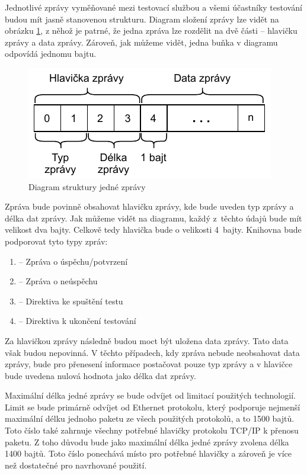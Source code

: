 Jednotlivé zprávy vyměňované mezi testovací službou a všemi účastníky testování budou mít jasně stanovenou strukturu. Diagram složení zprávy lze vidět na obrázku \ref{fig:message}, z něhož je patrné, že jedna zpráva lze rozdělit na dvě části -- hlavičku zprávy a data zprávy. Zároveň, jak můžeme vidět, jedna buňka v diagramu odpovídá jednomu bajtu. 

\begin{figure}[htbp]
    \centering 
    \includegraphics{assets/img/message.pdf}
    \caption{Diagram struktury jedné zprávy}
    \label{fig:message}
\end{figure}

Zpráva bude povinně obsahovat hlavičku zprávy, kde bude uveden typ zprávy a délka dat zprávy. Jak můžeme vidět na diagramu, každý z~těchto údajů bude mít velikost dva bajty. Celkově tedy hlavička bude o velikosti 4~bajty. Knihovna bude podporovat tyto typy zpráv:

\begin{enumerate}
    \item {} -- Zpráva o úspěchu/potvrzení
    \item {} -- Zpráva o neúspěchu
    \item {} -- Direktiva ke spuštění testu
    \item {} -- Direktiva k ukončení testování
\end{enumerate}

Za hlavičkou zprávy následně budou moct být uložena data zprávy. Tato data však budou nepovinná. V těchto případech, kdy zpráva nebude neobsahovat data zprávy, bude pro přenesení informace postačovat pouze typ zprávy a v hlavičce bude uvedena nulová hodnota jako délka dat zprávy. 

Maximální délka jedné zprávy se bude odvíjet od limitací použitých technologií. Limit se bude primárně odvíjet od Ethernet protokolu, který podporuje nejmenší maximální délku jednoho paketu ze všech použitých protokolů, a to 1500 bajtů. Toto číslo také zahrnuje všechny potřebné hlavičky protokolu TCP/IP k přenosu paketu. Z toho důvodu bude jako maximální délka jedné zprávy zvolena délka 1400 bajtů. Toto číslo ponechává místo pro potřebné hlavičky a zároveň je více než dostatečné pro navrhované použití. \cite{max_packet_size} 

